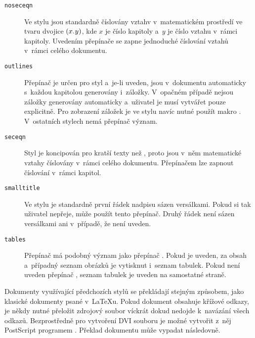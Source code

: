 \documentclass[12pt]{article}
\begin{document}
\begin{description}
\item[{\tt noseceqn}]
  Ve stylu  jsou standardně číslovány vztahv v~matematickém
  prostředí ve tvaru dvojice \mbox{$(x.\kern.5pt y)$},
  kde $x$ je číslo kapitoly a~$y$ je číslo vztahu v~rámci kapitoly.
  Uvedením přepínače  se zapne jednoduché číslování vztahů
  v~rámci celého dokumentu.

\item[{\tt outlines}]
  Přepínač je určen pro styl  a~je-li uveden, jsou v~dokumentu
  automaticky s~každou kapitolou generovány i~záložky. V~opačném případě nejsou
  záložky generovány automaticky a~uživatel je musí vytvářet pouze explicitně.
  Pro zobrazení záložek je ve stylu  navíc nutné použít makro
  . V~ostatních stylech nemá
  přepínač  význam.

\item[{\tt seceqn}]
  Styl  je koncipován pro kratší texty než , proto
  jsou v~něm matematické vztahy číslovány v~rámci celého dokumentu.
  Přepínačem  lze zapnout číslování v~rámci kapitol.

\item[{\tt smalltitle}]
  Ve stylu  je standardně první řádek nadpisu sázen versálkami.
  Pokud si tak uživatel nepřeje, může použít tento přepínač. Druhý řádek
  není sázen versálkami ani v~případě, že  není uveden.

\item[{\tt tables}]
  Přepínač má podobný význam jako přepínač . Pokud je uveden, 
  za obsah a~případný seznam obrázků je vytisknut i~seznam tabulek.
  Pokud není uveden přepínač , seznam tabulek je uveden
  na samostatné straně.

\end{description}

Dokumenty využívající předchozích stylů se překládají stejným způsobem, jako
klasické dokumenty psané v~\LaTeX u. Pokud dokument obsahuje křížové odkazy,
je někdy nutné přeložit zdrojový soubor víckrát dokud nedojde k~navázání všech
odkazů. Bezprostředně pro vytvoření DVI souboru je možné vytvořit 
z~něj PostScript programem . Překlad dokumentu může vypadat
následovně.

\begin{flushleft}
   \\
\end{flushleft}
\end{document}
